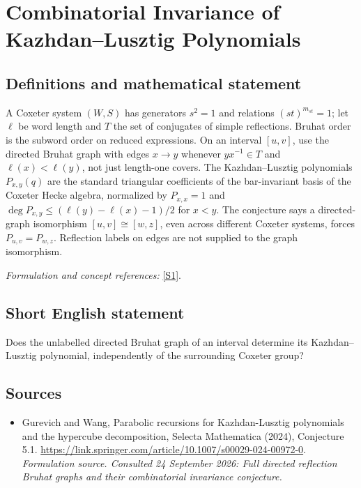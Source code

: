 \documentclass[11pt]{article}
\begin{document}
\section*{\texorpdfstring{Combinatorial Invariance of Kazhdan–Lusztig Polynomials}{Combinatorial Invariance of Kazhdan–Lusztig Polynomials}}\label{statement}
\subsection{Definitions and mathematical statement}
A Coxeter system $(W,S)$ has generators $s^2=1$ and relations $(st)^{m_{st}}=1$; let $\ell$ be word length and $T$ the set of conjugates of simple reflections. Bruhat order is the subword order on reduced expressions. On an interval $[u,v]$, use the directed Bruhat graph with edges $x\to y$ whenever $yx^{-1}\in T$ and $\ell(x)<\ell(y)$, not just length-one covers. The Kazhdan--Lusztig polynomials $P_{x,y}(q)$ are the standard triangular coefficients of the bar-invariant basis of the Coxeter Hecke algebra, normalized by $P_{x,x}=1$ and $\deg P_{x,y}\le(\ell(y)-\ell(x)-1)/2$ for $x<y$. The conjecture says a directed-graph isomorphism $[u,v]\cong[w,z]$, even across different Coxeter systems, forces $P_{u,v}=P_{w,z}$. Reflection labels on edges are not supplied to the graph isomorphism.
\par\smallskip\textit{Formulation and concept references:} \href{https://link.springer.com/article/10.1007/s00029-024-00972-0}{[S1]}.

\subsection{Short English statement}
Does the unlabelled directed Bruhat graph of an interval determine its Kazhdan--Lusztig polynomial, independently of the surrounding Coxeter group?
\subsection{Sources}
\begin{itemize}
\item[S1]Gurevich and Wang, Parabolic recursions for Kazhdan-Lusztig polynomials and the hypercube decomposition, Selecta Mathematica (2024), Conjecture 5.1.
\url{https://link.springer.com/article/10.1007/s00029-024-00972-0}.
\textit{Formulation source. Consulted 24 September 2026: Full directed reflection Bruhat graphs and their combinatorial invariance conjecture.}
\end{itemize}
\end{document}
